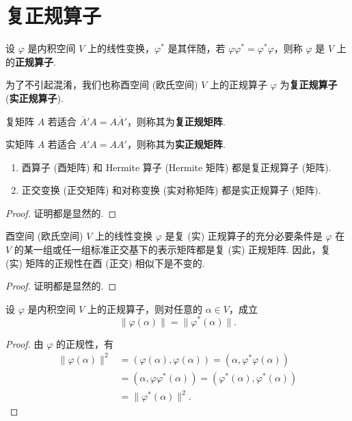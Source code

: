 \documentclass[../../main.tex]{subfiles}%
\begin{document}
\section{复正规算子}

\begin{definition}[正规算子和正规矩阵]
设 $\varphi$ 是内积空间 $V$ 上的线性变换，$\varphi^*$ 是其伴随，若 $\varphi\varphi^* = \varphi^*\varphi$，则称 $\varphi$ 是 $V$ 上的\textbf{正规算子}. 

为了不引起混淆，我们也称酉空间 (欧氏空间) $V$ 上的正规算子 $\varphi$ 为\textbf{复正规算子} (\textbf{实正规算子}). 

复矩阵 $A$ 若适合 $\overline{A}'A = A\overline{A}'$，则称其为\textbf{复正规矩阵}. 

实矩阵 $A$ 若适合 $A'A = AA'$，则称其为\textbf{实正规矩阵}.
\end{definition}

\begin{proposition}\label{proposition:常见的正规矩阵}
\begin{enumerate}
\item 酉算子 (酉矩阵) 和 Hermite 算子 (Hermite 矩阵) 都是复正规算子 (矩阵).

\item 正交变换 (正交矩阵) 和对称变换 (实对称矩阵) 都是实正规算子 (矩阵).
\end{enumerate}
\end{proposition}
\begin{proof}
证明都是显然的.
\end{proof}

\begin{theorem}
酉空间 (欧氏空间) $V$ 上的线性变换 $\varphi$ 是复 (实) 正规算子的充分必要条件是 $\varphi$ 在 $V$ 的某一组或任一组标准正交基下的表示矩阵都是复 (实) 正规矩阵. 因此，复 (实) 矩阵的正规性在酉 (正交) 相似下是不变的. 
\end{theorem}
\begin{proof}
证明都是显然的.
\end{proof}

\begin{lemma}\label{lemma:正规算子与伴随的像的范数相同}
设 $\varphi$ 是内积空间 $V$ 上的正规算子，则对任意的 $\alpha \in V$，成立
\[
\|\varphi(\alpha)\| = \|\varphi^*(\alpha)\|.
\]
\end{lemma}
\begin{proof}
由 $\varphi$ 的正规性，有
\begin{align*}
\|\varphi(\alpha)\|^2 &= (\varphi(\alpha),\varphi(\alpha)) = (\alpha,\varphi^*\varphi(\alpha))\\
&= (\alpha,\varphi\varphi^*(\alpha)) = (\varphi^*(\alpha),\varphi^*(\alpha))\\
&= \|\varphi^*(\alpha)\|^2. 
\end{align*}
\end{proof}
\end{document}
